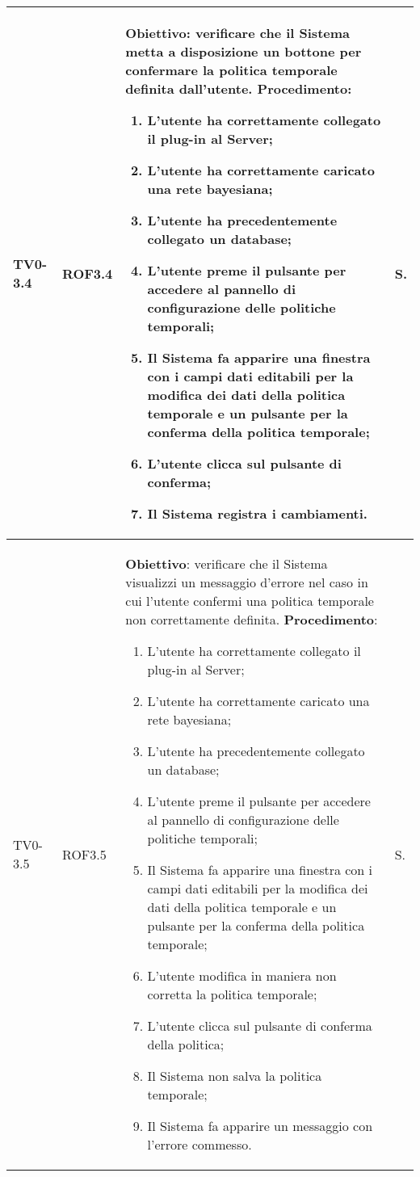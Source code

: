 \begin{longtable}{|C{.15\textwidth}|C{.13\textwidth}|m{.65\textwidth}|C{.08\textwidth}|}
TV0-3.4 & ROF3.4 &
	\textbf{Obiettivo}: verificare che il Sistema metta a disposizione un bottone per confermare la politica temporale definita dall'utente. \newline
	\textbf{Procedimento}:
	\begin{enumerate}
		\item L'utente ha correttamente collegato il plug-in al Server;
		\item L'utente ha correttamente caricato una rete bayesiana;
		\item L'utente ha precedentemente collegato un database;
		\item L'utente preme il pulsante per accedere al pannello di configurazione delle politiche temporali;
		\item Il Sistema fa apparire una finestra con i campi dati editabili per la modifica dei dati della politica temporale e un pulsante per la conferma della politica temporale;
		\item L'utente clicca sul pulsante di conferma;
		\item Il Sistema registra i cambiamenti.
	\end{enumerate}
	& S. \\
\hline

TV0-3.5 & ROF3.5 &
	\textbf{Obiettivo}: verificare che il Sistema visualizzi un messaggio d'errore nel caso in cui l'utente confermi una politica temporale non correttamente definita. \newline
	\textbf{Procedimento}:
	\begin{enumerate}
		\item L'utente ha correttamente collegato il plug-in al Server;
		\item L'utente ha correttamente caricato una rete bayesiana;
		\item L'utente ha precedentemente collegato un database;
		\item L'utente preme il pulsante per accedere al pannello di configurazione delle politiche temporali;
		\item Il Sistema fa apparire una finestra con i campi dati editabili per la modifica dei dati della politica temporale e un pulsante per la conferma della politica temporale;
		\item L'utente modifica in maniera non corretta la politica temporale;
		\item L'utente clicca sul pulsante di conferma della politica;
		\item Il Sistema non salva la politica temporale;
		\item Il Sistema fa apparire un messaggio con l'errore commesso.
	\end{enumerate}
	& S. \\
\hline


\end{longtable}
